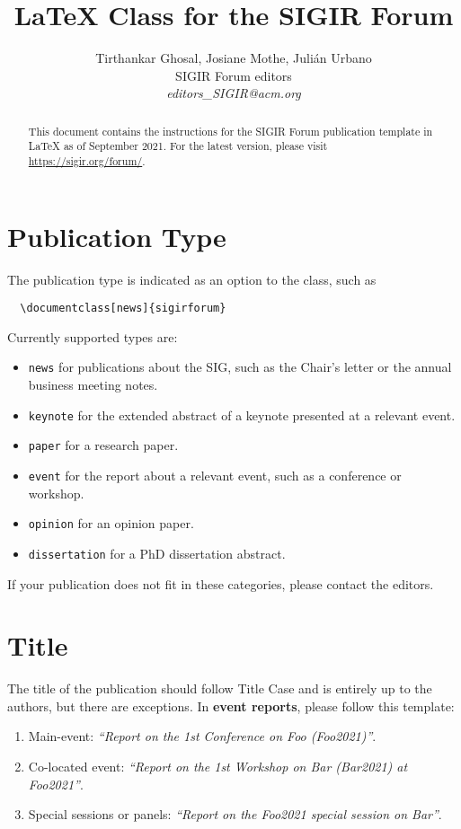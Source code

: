 \documentclass[news]{sigirforum}
\begin{document}
\title{\LaTeX\xspace Class for the SIGIR Forum}

\author{
Tirthankar Ghosal, Josiane Mothe, Juli\'an Urbano\\SIGIR Forum editors\\\emph{editors\_SIGIR@acm.org}}

\maketitle 
\begin{abstract}
This document contains the instructions for the SIGIR Forum publication template in \LaTeX\xspace as of September 2021. For the latest version, please visit \url{https://sigir.org/forum/}. 
\end{abstract}

\section{Publication Type}

The publication type is indicated as an option to the class, such as
\begin{verbatim}
  \documentclass[news]{sigirforum}
\end{verbatim}
Currently supported types are:
\begin{itemize}
	\item \texttt{news} for publications about the SIG, such as the Chair's letter or the annual business meeting notes.
	\item \texttt{keynote} for the extended abstract of a keynote presented at a relevant event.
	\item \texttt{paper} for a research paper.
	\item \texttt{event} for the report about a relevant event, such as a conference or workshop.
	\item \texttt{opinion} for an opinion paper.
	\item \texttt{dissertation} for a PhD dissertation abstract.
\end{itemize}

If your publication does not fit in these categories, please contact the editors.

\section{Title}

The title of the publication should follow Title Case and is entirely up to the authors, but there are exceptions. In \textbf{event reports}, please follow this template:
\begin{enumerate}
	\item Main-event: \textsl{``Report on the 1st Conference on Foo (Foo2021)''}.
	\item Co-located event: \textsl{``Report on the 1st Workshop on Bar (Bar2021) at Foo2021''}.
	\item Special sessions or panels: \textsl{``Report on the Foo2021 special session on Bar''}.
\end{enumerate}
\end{document}
